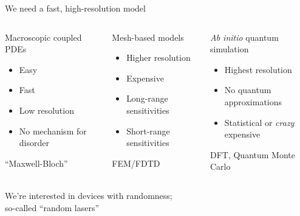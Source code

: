 \documentclass[12pt,usenames,dvipsnames]{beamer}
\newcommand\pro{\item[$\textcolor{ForestGreen}{+}$]}
\newcommand\con{\item[$\textcolor{BrickRed}{-}$]}
\begin{document}
\begin{frame}{We need a fast, high-resolution model}
  \vspace{-0.2cm}
  \begin{columns}[t]
    \begin{column}{0.33\textwidth}
      \centering
      Macroscopic coupled PDEs
      \begin{itemize}
        \pro Easy
        \pro Fast
        \con Low resolution
        \con No mechanism for disorder
      \end{itemize}
      ``Maxwell-Bloch''
    \end{column}
    \vrule
    \begin{column}{0.33\textwidth}
      \centering
      Mesh-based models
      \begin{itemize}
        \pro Higher resolution
        \con Expensive
        \con Long-range sensitivities
        \con Short-range sensitivities
      \end{itemize}
      FEM/FDTD
    \end{column}
    \vrule
    \begin{column}{0.33\textwidth}
      \centering
      \emph{Ab initio} quantum simulation
      \begin{itemize}
        \pro Highest resolution
        \pro No quantum approximations
        \con Statistical or \emph{crazy} expensive
      \end{itemize}
      DFT, Quantum Monte Carlo
    \end{column}
  \end{columns}
  \begin{center}
    \textcolor{BrickRed}{We're interested in devices with randomness; \\ so-called ``random lasers''} 
  \end{center}
\end{frame}
\end{document}

